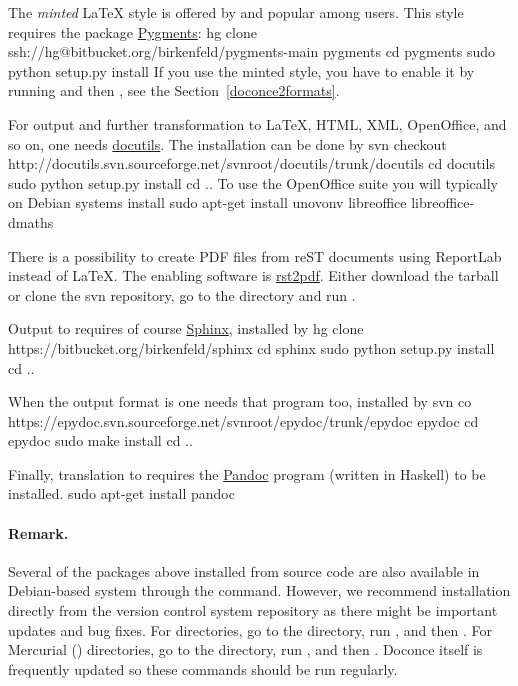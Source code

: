 \documentclass{book}
\begin{document}
The \emph{minted} {\LaTeX} style is offered by  and popular among
users. This style requires the package \href{{http://pygments.org}}{Pygments}:
\bsys
hg clone ssh://hg@bitbucket.org/birkenfeld/pygments-main pygments
cd pygments
sudo python setup.py install
\esys
If you use the minted style, you have to enable it by running
 and then , see
the Section~\ref{doconce2formats}.

For  output and further transformation to {\LaTeX}, HTML, XML,
OpenOffice, and so on, one needs \href{{http://docutils.sourceforge.net}}{docutils}.
The installation can be done by
\bsys
svn checkout http://docutils.svn.sourceforge.net/svnroot/docutils/trunk/docutils
cd docutils
sudo python setup.py install
cd ..
\esys
To use the OpenOffice suite you will typically on Debian systems install
\bsys
sudo apt-get install unovonv libreoffice libreoffice-dmaths
\esys

There is a possibility to create PDF files from reST documents
using ReportLab instead of {\LaTeX}. The enabling software is
\href{{http://code.google.com/p/rst2pdf}}{rst2pdf}. Either download the tarball
or clone the svn repository, go to the  directory and
run .


Output to  requires of course \href{{http://sphinx.pocoo.org}}{Sphinx},
installed by
\bsys
hg clone https://bitbucket.org/birkenfeld/sphinx
cd sphinx
sudo python setup.py install
cd ..
\esys

When the output format is  one needs that program too, installed
by
\bsys
svn co https://epydoc.svn.sourceforge.net/svnroot/epydoc/trunk/epydoc epydoc
cd epydoc
sudo make install
cd ..
\esys

Finally, translation to  requires the
\href{{http://johnmacfarlane.net/pandoc/}}{Pandoc} program
(written in Haskell) to be installed.
\bsys
sudo apt-get install pandoc
\esys

\paragraph{Remark.}
Several of the packages above installed from source code
are also available in Debian-based system through the
 command. However, we recommend installation directly
from the version control system repository as there might be important
updates and bug fixes. For  directories, go to the directory,
run , and then . For
Mercurial () directories, go to the directory, run
, and then .
Doconce itself is frequently updated so these commands should be
run regularly.


\printindex
\end{document}
